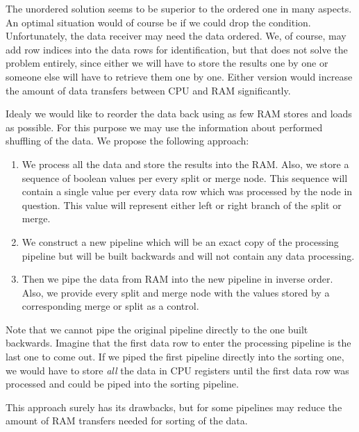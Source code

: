 The unordered solution seems to be superior to the ordered one in many aspects. An optimal situation would of course be if we could drop the condition. Unfortunately, the data receiver may need the data ordered.  We, of course, may add row indices into the data rows for identification, but that does not solve the problem entirely, since either we will have to store the results one by one or someone else will have to retrieve them one by one. Either version would increase the amount of data transfers between CPU and RAM significantly. 


Idealy we would like to reorder the data back using as few RAM stores and loads as possible. For this purpose we may use the information about performed shuffling of the data. We propose the following approach:
\begin{enumerate}
  \item We process all the data and store the results into the RAM. Also, we store a sequence of boolean values per every split or merge node. This sequence will contain a single value per every data row which was processed by the node in question. This value will represent either left or right branch of the split or merge.
  \item We construct a new pipeline which will be an exact copy of the processing pipeline but will be built backwards and will not contain any data processing.
  \item Then we pipe the data from RAM into the new pipeline in inverse order. Also, we provide every split and merge node with the values stored by a corresponding merge or split as a control.
\end{enumerate}

\begin{rem}
  Note that we cannot pipe the original pipeline directly to the one built backwards. Imagine that the first data row to enter the processing pipeline is the last one to come out. If we piped the first pipeline directly into the sorting one, we would have to store \emph{all} the data in CPU registers until the first data row was processed and could be piped into the sorting pipeline.
\end{rem}

This approach surely has its drawbacks, but for some pipelines may reduce the amount of RAM transfers needed for sorting of the data.

